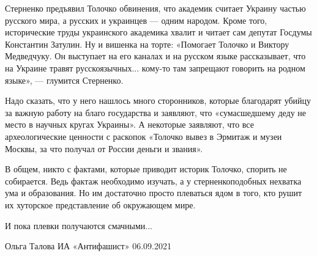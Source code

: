 Стерненко предъявил Толочко обвинения, что академик считает Украину частью
русского мира, а русских и украинцев — одним народом. Кроме того, исторические
труды украинского академика хвалит и читает сам депутат Госдумы Константин
Затулин. Ну и вишенка на торте: «Помогает Толочко и Виктору Медведчуку. Он
выступает на его каналах и на русском языке рассказывает, что на Украине травят
русскоязычных... кому-то там запрещают говорить на родном языке», — глумится
Стерненко.

Надо сказать, что у него нашлось много сторонников, которые благодарят убийцу
за важную работу на благо государства и заявляют, что «сумасшедшему деду не
место в научных кругах Украины». А некоторые заявляют, что все археологические
ценности с раскопок «Толочко вывез в Эрмитаж и музеи Москвы, за что получал от
России деньги и звания».

В общем, никто с фактами, которые приводит историк Толочко, спорить не
собирается. Ведь фактаж необходимо изучать, а у стерненкоподобных нехватка ума
и образования. Но им достаточно просто плеваться ядом в того, кто рушит их
хуторское представление об окружающем мире. 

И пока плевки получаются смачными...

Ольга Талова
ИА «Антифашист»
06.09.2021
